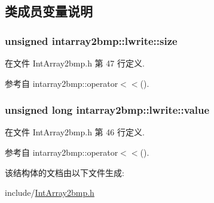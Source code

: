 \subsection{类成员变量说明}
\subsubsection[{\texorpdfstring{size}{size}}]{\setlength{\rightskip}{0pt plus 5cm}unsigned intarray2bmp\+::lwrite\+::size}\hypertarget{structintarray2bmp_1_1lwrite_af9a3a6332e486dec31a6a3264ed00a98}{}\label{structintarray2bmp_1_1lwrite_af9a3a6332e486dec31a6a3264ed00a98}


在文件 Int\+Array2bmp.\+h 第 47 行定义.



参考自 intarray2bmp\+::operator$<$$<$().

\subsubsection[{\texorpdfstring{value}{value}}]{\setlength{\rightskip}{0pt plus 5cm}unsigned long intarray2bmp\+::lwrite\+::value}\hypertarget{structintarray2bmp_1_1lwrite_a054185f53b9977e24f9e54bc611f7e9e}{}\label{structintarray2bmp_1_1lwrite_a054185f53b9977e24f9e54bc611f7e9e}


在文件 Int\+Array2bmp.\+h 第 46 行定义.



参考自 intarray2bmp\+::operator$<$$<$().



该结构体的文档由以下文件生成\+:\begin{DoxyCompactItemize}
\item 
include/\hyperlink{IntArray2bmp_8h}{Int\+Array2bmp.\+h}\end{DoxyCompactItemize}
